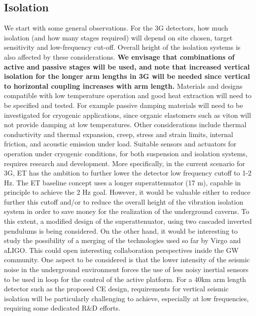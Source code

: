 \subsection{Isolation }
We start with some general observations. For the 3G detectors, how much isolation (and how many stages required) will depend on site chosen, target sensitivity and low-frequency cut-off. Overall height of the isolation systems is also affected by these considerations. {\bf We envisage that combinations of active and passive stages will be used, and note that increased vertical isolation for the longer arm lengths in 3G will be needed since vertical to horizontal coupling increases with arm length.} Materials and designs compatible with low temperature operation and good heat extraction will need to be specified and tested. For example passive damping materials will need to be investigated for cryogenic applications, since organic elastomers such as viton will not provide damping at low temperatures. Other considerations include thermal conductivity and thermal expansion, creep, stress and strain limits, internal friction, and acoustic emission under load. Suitable sensors and actuators for operation under cryogenic conditions, for both suspension and isolation systems, requires research and development.
More specifically, in the current scenario for 3G, ET has the ambition to further lower the detector low frequency cutoff to 1-2 Hz. The ET baseline concept uses a longer superattenuator (17 m), capable in principle to achieve the 2 Hz goal. However, it would be valuable either to reduce further this cutoff and/or to reduce the overall height of the vibration isolation system in order to save money for the realization of the underground caverns.
To this extent, a modified design of the superattenuator, using two cascaded inverted pendulums is being considered. On the other hand, it would be interesting to study the possibility of a merging of the technologies used so far by Virgo and aLIGO. This could open interesting collaboration perspectives inside the GW community.
One aspect to be considered is that the lower intensity of the seismic noise in the underground environment forces the use of less noisy inertial sensors to be used in loop for the control of the active platform. 
For a 40km arm length detector such as the proposed CE design, requirements for vertical seismic isolation will be particularly challenging to achieve, especially at low frequencies, requiring some dedicated R\&D efforts. 

